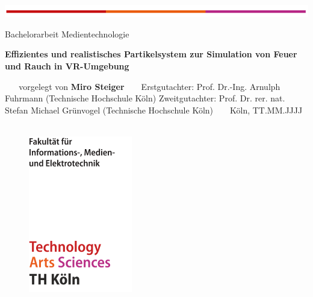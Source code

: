 \documentclass[a4paper,11pt]{article} %
\renewcommand{\\}{\vspace*{0.5\baselineskip} \newline}
\begin{document}
\begin{titlepage}
	\begin{flushleft}
		\vspace*{-1cm}
		\includegraphics[scale=1]{Grafiken/TH.png}\\
		\vspace*{2cm}
	\end{flushleft}

	\begin{flushleft}
		Bachelorarbeit Medientechnologie
	\end{flushleft}

	\begin{huge}
		\noindent
		\bfseries
		Effizientes und realistisches Partikelsystem zur Simulation von Feuer und Rauch in VR-Umgebung \\
	\end{huge}
	~\\
	~\\
	\noindent
	vorgelegt von                   \\
	\textbf{Miro Steiger}			\\
	~\\
	~\\
	\noindent
	Erstgutachter: Prof. Dr.-Ing. Arnulph Fuhrmann (Technische Hochschule Köln)              \\
	Zweitgutachter:  Prof. Dr. rer. nat. Stefan Michael Grünvogel (Technische Hochschule Köln)
	~\\
	~\\
	Köln, TT.MM.JJJJ
	~\\
	~\\
	\begin{figure}[b]
		\begin{flushright}
			\includegraphics[scale=1]{Grafiken/TH_F07_cover.png}\\
		\end{flushright}
	\end{figure}

	\pagestyle{fancy}
\end{titlepage}
\end{document}
